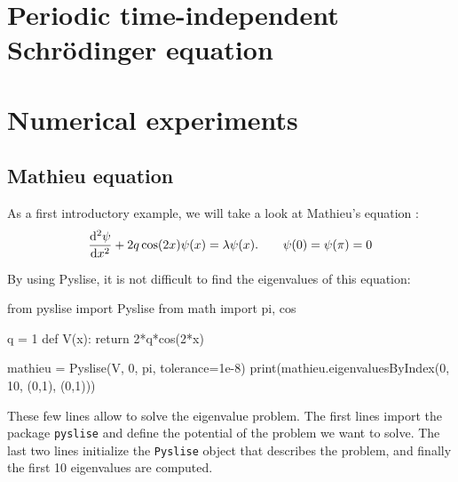 \cite{baeyens_fast_2020}

\section{Periodic \texorpdfstring{\oneD}{1D} time-independent Schrödinger equation}
\label{sec:1d_periodic}

\begin{theorem}

\end{theorem}
\cite{binding_prufer_2012}


\section{Numerical experiments}\label{sec:c2_numerical_experiments}

\subsection{Mathieu equation}\label{mathieu-equation}

As a first introductory example, we will take a look at Mathieu's
equation \cite{pryce_sltstpak_1999}: \begin{equation}
    \dv[2]{\psi}{x} + 2q\cos(2x)\psi(x) = \lambda\psi(x) \text{.}  \qquad \psi(0) = \psi(\pi) = 0
    \label{mathieu}
\end{equation}

By using Pyslise, it is not difficult to find the eigenvalues of this
equation:

\begin{python}
  from pyslise import Pyslise
  from math import pi, cos
  
  q = 1
  def V(x):
    return 2*q*cos(2*x)
  
  mathieu = Pyslise(V, 0, pi, tolerance=1e-8)
  print(mathieu.eigenvaluesByIndex(0, 10, (0,1), (0,1)))
\end{python}

These few lines allow to solve the eigenvalue problem. The first
lines import the package \texttt{pyslise} and define the potential of the problem we want to
solve. The last two lines initialize the \texttt{Pyslise} object that
describes the problem, and finally the first 10 eigenvalues are
computed.

